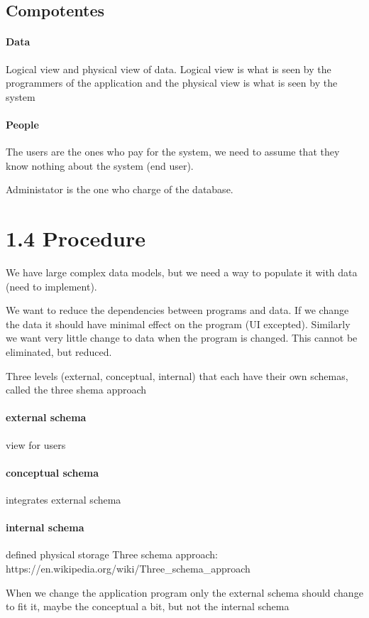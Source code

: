 \documentclass{article}
\begin{document}
\subsection{Compotentes}
\paragraph{Data}
Logical view and physical view of data. Logical view is what is seen by the programmers of the application and the physical view is what is seen by the system

\paragraph{People}
The users are the ones who pay for the system, we need to assume that they know nothing about the system (end user).

Administator is the one who charge of the database.

\section{1.4 Procedure}
We have large complex data models, but we need a way to populate it with data (need to implement).

We want to reduce the dependencies between programs and data. If we change the data it should have minimal effect on the program (UI excepted). Similarly we want very little change to data when the program is changed. This cannot be eliminated, but reduced.

Three levels (external, conceptual, internal) that each have their own schemas, called the three shema approach
\paragraph{external schema} view for users

\paragraph{conceptual schema} integrates external schema

\paragraph{internal schema} defined physical storage
Three schema approach: https://en.wikipedia.org/wiki/Three_schema_approach

When we change the application program only the external schema should change to fit it, maybe the conceptual a bit, but not the internal schema
\end{document}
